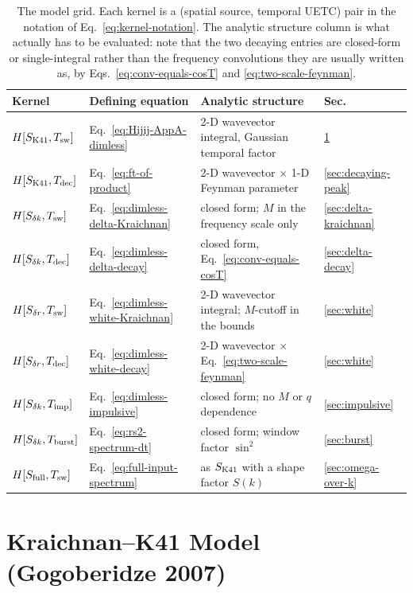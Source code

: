 \documentclass[10pt,prd,aps,nobibnotes,superscriptaddress,preprintnumbers,notitlepage]{revtex4-1}
\begin{document}
\begin{table}[ht]
  \centering
  \begin{tabular}{llll}
  \hline
  Kernel & Defining equation & Analytic structure & Sec. \\
  \hline
  $H[S_{\rm K41},T_{\rm sw}]$   & Eq.~\eqref{eq:Hijij-AppA-dimless}
    & 2-D wavevector integral, Gaussian temporal factor & \ref{sec:kraichnan-k41} \\
  $H[S_{\rm K41},T_{\rm dec}]$  & Eq.~\eqref{eq:ft-of-product}
    & 2-D wavevector $\times$ 1-D Feynman parameter & \ref{sec:decaying-peak} \\
  $H[S_{\delta k},T_{\rm sw}]$  & Eq.~\eqref{eq:dimless-delta-Kraichnan}
    & closed form; $M$ in the frequency scale only & \ref{sec:delta-kraichnan} \\
  $H[S_{\delta k},T_{\rm dec}]$ & Eq.~\eqref{eq:dimless-delta-decay}
    & closed form, Eq.~\eqref{eq:conv-equals-cosT} & \ref{sec:delta-decay} \\
  $H[S_{\delta r},T_{\rm sw}]$  & Eq.~\eqref{eq:dimless-white-Kraichnan}
    & 2-D wavevector integral; $M$-cutoff in the bounds & \ref{sec:white} \\
  $H[S_{\delta r},T_{\rm dec}]$ & Eq.~\eqref{eq:dimless-white-decay}
    & 2-D wavevector $\times$ Eq.~\eqref{eq:two-scale-feynman} & \ref{sec:white} \\
  $H[S_{\delta k},T_{\rm imp}]$ & Eq.~\eqref{eq:dimless-impulsive}
    & closed form; no $M$ or $q$ dependence & \ref{sec:impulsive} \\
  $H[S_{\delta k},T_{\rm burst}]$ & Eq.~\eqref{eq:rs2-spectrum-dt}
    & closed form; window factor $\sin^{2}$ & \ref{sec:burst} \\
  $H[S_{\rm full},T_{\rm sw}]$  & Eq.~\eqref{eq:full-input-spectrum}
    & as $S_{\rm K41}$ with a shape factor $S(k)$ & \ref{sec:omega-over-k} \\
  \hline
  \end{tabular}
  \caption{The model grid. Each kernel is a (spatial source, temporal UETC)
  pair in the notation of Eq.~\eqref{eq:kernel-notation}. The analytic structure
  column is what actually has to be evaluated: note that the two decaying
  entries are closed-form or single-integral rather than the frequency
  convolutions they are usually written as, by
  Eqs.~\eqref{eq:conv-equals-cosT} and \eqref{eq:two-scale-feynman}.}
  \label{tab:model-grid}
\end{table}
\section{Kraichnan--K41 Model (Gogoberidze 2007)}
\label{sec:kraichnan-k41}
\end{document}
